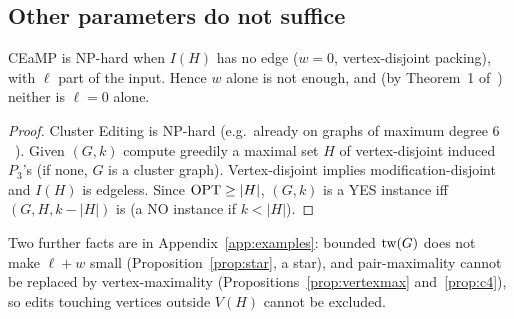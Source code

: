 \subsection{Other parameters do not suffice}
\begin{proposition}\label{prop:w0}
CEaMP is NP-hard when $I(H)$ has no edge ($w=0$, vertex-disjoint packing), with $\ell$ part of the input. Hence $w$ alone is not enough, and (by Theorem~1 of~\cite{LPS23}) neither is $\ell=0$ alone.
\end{proposition}
\begin{proof}
Cluster Editing is NP-hard (e.g.\ already on graphs of maximum degree $6$~\cite{KU12}). Given $(G,k)$ compute greedily a maximal set $H$ of vertex-disjoint induced $P_3$'s (if none, $G$ is a cluster graph). Vertex-disjoint implies modification-disjoint and $I(H)$ is edgeless. Since $\mathrm{OPT}\ge|H|$, $(G,k)$ is a YES instance iff $(G,H,k-|H|)$ is (a NO instance if $k<|H|$).
\end{proof}
Two further facts are in Appendix~\ref{app:examples}: bounded $\mathrm{tw}(G)$ does not make $\ell+w$ small (Proposition~\ref{prop:star}, a star), and pair-maximality cannot be replaced by vertex-maximality (Propositions~\ref{prop:vertexmax} and~\ref{prop:c4}), so edits touching vertices outside $V(H)$ cannot be excluded.
